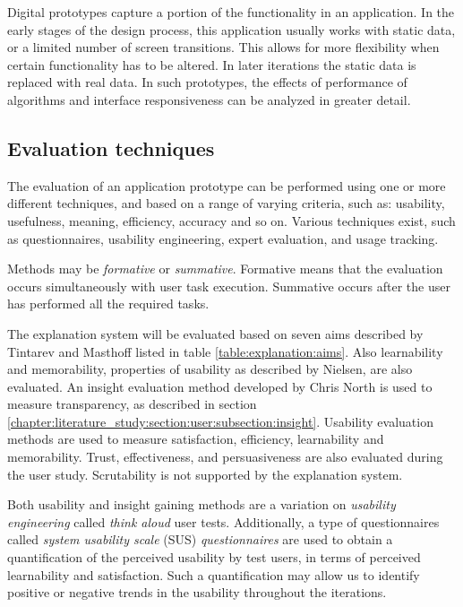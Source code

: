 Digital prototypes capture a portion of the functionality in an application. In the early stages of the design process, this application usually works with static data, or a limited number of screen transitions. This allows for more flexibility when certain functionality has to be altered. In later iterations the static data is replaced with real data. In such prototypes, the effects of performance of algorithms and interface responsiveness can be analyzed in greater detail.


\subsection{Evaluation techniques}\label{chapter:prototype:section:methodology:subsection:evaluation}

The evaluation of an application prototype can be performed using one or more different techniques, and based on a range of varying criteria, such as: usability, usefulness, meaning, efficiency, accuracy and so on. Various techniques exist, such as questionnaires, usability engineering, expert evaluation, and usage tracking\cite{duval:2012:chi:evaluation}.

Methods may be \emph{formative} or \emph{summative}. Formative means that the evaluation occurs simultaneously with user task execution. Summative occurs after the user has performed all the required tasks\cite{duval:2012:chi:evaluation}.

The explanation system will be evaluated based on seven aims described by Tintarev and Masthoff \cite{tintarev:2007:SER:1547550.1547664} listed in table \ref{table:explanation:aims}. Also learnability and memorability, properties of usability as described by Nielsen\cite{nielsen:1993:UE:529793}, are also evaluated. An insight evaluation method developed by Chris North \cite{north:2006} is used to measure transparency, as described in section \ref{chapter:literature_study:section:user:subsection:insight}. Usability evaluation methods are used to measure satisfaction, efficiency, learnability and memorability. Trust, effectiveness, and persuasiveness are also evaluated during the user study. Scrutability is not supported by the explanation system.

Both usability and insight gaining methods are a variation on \emph{usability engineering} called \emph{think aloud} user tests. Additionally, a type of questionnaires called \emph{system usability scale} (SUS) \emph{questionnaires} are used to obtain a quantification of the perceived usability by test users, in terms of perceived learnability and satisfaction. Such a quantification may allow us to identify positive or negative trends in the usability throughout the iterations.


